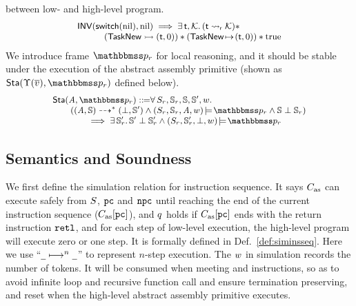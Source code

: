 between low- and high-level program.
\[
    \small
    \begin{array}{l}
        \textsf{INV}{(\mathsf{switch}(\text{nil}), \text{nil})}
        \implies
        \exists \, \textsf{t}, \mathcal{K}. \,
        ({\textsf{t}} \leadsto_{\textsf{r}} {\mathcal{K}}) * \\
        \qquad\quad
        ({\mathsf{TaskNew}} \rightarrowtail {(\textsf{t}, 0)})
        *
        ({\mathsf{TaskNew}} \!\mapsto\! {(\textsf{t}, 0)})
        * \text{true}
    \end{array}
\]
We introduce frame $\relastP_r$ for local reasoning,
and it should be stable under the execution
of the abstract assembly primitive
(shown as $\Sta(\hprim(\args{\val}), \relastP_r)$
defined below).
\[
    \small
    \begin{array}{l}
        \Sta(\primcom, \relastP_r)
        \define
        \forall \, \state_r, \hpstate_r, \hpstate,
        \hpstate', \word. \\
        \qquad
        (\primTransMulti{(\primcom, \hpstate)}{*}{(\primdone, \hpstate')}
        \land \asrtmodel{(\state_r, \hpstate_r, \primcom, \word)}{\relastP_r}
        \land \hpstate\perp\hpstate_r) \\
        \qquad\qquad
        \implies
        \exists\, \hpstate_r'. \,
        \hpstate'\perp\hpstate_r' \land
        \asrtmodel{(\state_r, \hpstate_r', \primdone, \word)}
            {\relastP_r}
    \end{array}
\]

\subsection{Semantics and Soundness}
\label{subsec:semantics and soundness}

We first define the simulation relation for
instruction sequence.
It says $C_{\text{as}}$ can execute safely
from $S$, $\texttt{pc}$ and $\texttt{npc}$ until reaching
the end of the current instruction sequence ($C_{\text{as}}[\texttt{pc}]$),
and $q$ holds if $C_{\text{as}}[\texttt{pc}]$ ends with the return
instruction $\texttt{retl}{}$, and for each step of low-level
execution, the high-level program will execute zero or
one step.
It is formally defined in Def.~\ref{def:siminsseq}.
Here we use ``$\underline{\ \,} \longmapsto^{n} \underline{\ \,}$'' to
represent $n$-step execution.
The $w$ in simulation records the number of tokens.
It will be consumed when meeting \jmp{} and \call{}
instructions, so as to avoid infinite loop and recursive
function call and ensure termination preserving,
and reset when the high-level
abstract assembly primitive executes.

